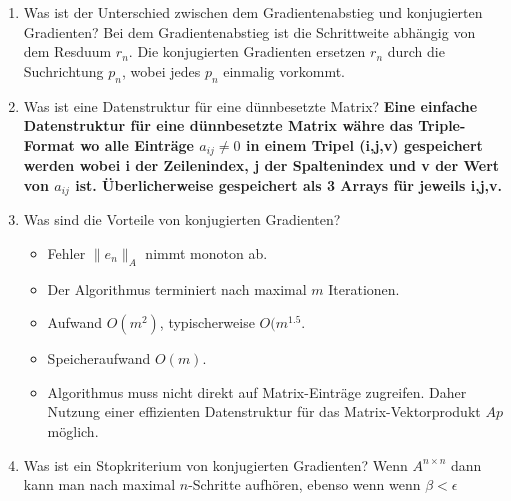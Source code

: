 \documentclass[10pt,a4paper,titlepage]{article}
\begin{document}
\begin{enumerate}[resume=b]
	\item Was ist der Unterschied zwischen dem Gradientenabstieg und konjugierten Gradienten? \newline
	Bei dem Gradientenabstieg ist die Schrittweite abhängig von dem Resduum $r_n$. Die konjugierten Gradienten ersetzen $r_n$ durch die Suchrichtung $p_n$, wobei jedes $p_n$ einmalig vorkommt.
	\item Was ist eine Datenstruktur für eine dünnbesetzte Matrix? \newline
	\textbf{Eine einfache Datenstruktur für eine dünnbesetzte Matrix währe das Triple-Format wo alle Einträge $a_{ij} \neq 0$ in einem Tripel (i,j,v) gespeichert werden
		wobei i der Zeilenindex, j der Spaltenindex und v der Wert von $a_{ij}$ ist. Überlicherweise gespeichert als 3 Arrays für jeweils i,j,v.}
	\item Was sind die Vorteile von konjugierten Gradienten?\\
	\begin{itemize}
		\item Fehler $ \|e_n\|_A$ nimmt monoton ab.
		\item Der Algorithmus terminiert nach maximal $m$ Iterationen. 
		\item Aufwand $O(m^2)$, typischerweise $O(m^{1.5}$.
		\item Speicheraufwand $O(m)$.
		\item Algorithmus muss nicht direkt auf Matrix-Einträge zugreifen. Daher Nutzung einer effizienten Datenstruktur für das Matrix-Vektorprodukt $Ap$ möglich.
	\end{itemize}
	\item Was ist ein Stopkriterium von konjugierten Gradienten?\newline
	Wenn $A^{n\times n}$ dann kann man nach maximal $n$-Schritte aufhören, ebenso wenn wenn $\beta<\epsilon$
\end{enumerate}
\end{document}
